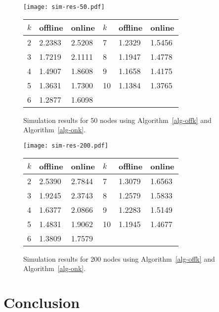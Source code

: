 \documentclass[pdftex,leqno,fleqn,12pts]{llncs}
\begin{document}
\begin{figure}
\centering
\texttt{[image: sim-res-50.pdf]}  
\begin{center}
\begin{tabular}{|l|ll|l|ll|}
\hline
$k$ & offline & online & $k$ & offline & online \\
\hline
2	 & 2.2383	 & 2.5208 & 7	 & 1.2329	 & 1.5456\\
3	 & 1.7219	 & 2.1111 & 8	 & 1.1947	 & 1.4778\\
4	 & 1.4907	 & 1.8608 & 9	 & 1.1658	 & 1.4175\\
5	 & 1.3631	 & 1.7300 & 10	 & 1.1384	 & 1.3765\\
6	 & 1.2877	 & 1.6098 & & & \\
\hline
\end{tabular}
\end{center}
\caption{Simulation results for 50 nodes using Algorithm~\ref{alg-offk} and Algorithm~\ref{alg-onk}.}\label{fig-simres-chromatic-50}
\end{figure}
\begin{figure}
\centering
\texttt{[image: sim-res-200.pdf]} 
\begin{center}
\begin{tabular}{|l|ll|l|ll|}
\hline
$k$ & offline & online & $k$ & offline & online \\
\hline
2 & 2.5390 & 2.7844 & 7 & 1.3079 & 1.6563\\
3 & 1.9245 & 2.3743 & 8 & 1.2579 & 1.5833\\
4 & 1.6377 & 2.0866 & 9 & 1.2283 & 1.5149\\
5 & 1.4831 & 1.9062 & 10 & 1.1945 & 1.4677\\
6 & 1.3809 & 1.7579 & & &\\
\hline
\end{tabular}
\end{center}
\caption{Simulation results for 200 nodes using Algorithm~\ref{alg-offk} and Algorithm~\ref{alg-onk}.}\label{fig-simres-chromatic-200}
\end{figure}













\section{Conclusion}\label{section-conclusion}
\end{document}
